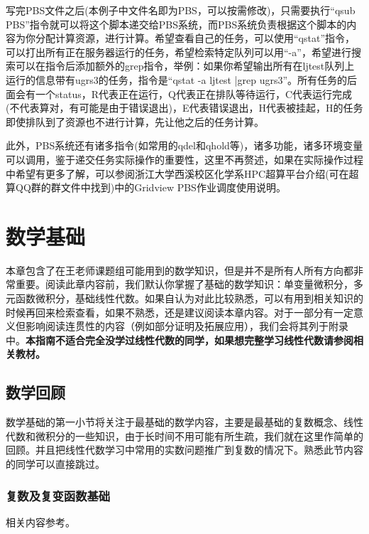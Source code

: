 \documentclass[12pt,a4paper,openany,twoside]{book}
\numberwithin{equation}{section}
\begin{document}
        写完PBS文件之后(本例子中文件名即为PBS，可以按需修改)，只需要执行“qsub PBS”指令就可以将这个脚本递交给PBS系统，而PBS系统负责根据这个脚本的内容为你分配计算资源，进行计算。希望查看自己的任务，可以使用“qstat”指令，可以打出所有正在服务器运行的任务，希望检索特定队列可以用“-a”，希望进行搜索可以在指令后添加额外的grep指令，举例：如果你希望输出所有在ljtest队列上运行的信息带有ugrs3的任务，指令是“qstat -a ljtest |grep ugrs3”。所有任务的后面会有一个status，R代表正在运行，Q代表正在排队等待运行，C代表运行完成(不代表算对，有可能是由于错误退出)，E代表错误退出，H代表被挂起，H的任务即使排队到了资源也不进行计算，先让他之后的任务计算。

        此外，PBS系统还有诸多指令(如常用的qdel和qhold等)，诸多功能，诸多环境变量可以调用，鉴于递交任务实际操作的重要性，这里不再赘述，如果在实际操作过程中希望有更多了解，可以参阅浙江大学西溪校区化学系HPC超算平台介绍(可在超算QQ群的群文件中找到)中的Gridview PBS作业调度使用说明。
      
    \chapter{数学基础}

      本章包含了在王老师课题组可能用到的数学知识，但是并不是所有人所有方向都非常重要。阅读此章内容前，我们默认你掌握了基础的数学知识：单变量微积分，多元函数微积分，基础线性代数。如果自认为对此比较熟悉，可以有用到相关知识的时候再回来检索查看，如果不熟悉，还是建议阅读本章内容。对于一部分有一定意义但影响阅读连贯性的内容（例如部分证明及拓展应用），我们会将其列于附录中。\textbf{本指南不适合完全没学过线性代数的同学，如果想完整学习线性代数请参阅相关教材。}

      \section{数学回顾}
      
        数学基础的第一小节将关注于最基础的数学内容，主要是最基础的复数概念、线性代数和微积分的一些知识，由于长时间不用可能有所生疏，我们就在这里作简单的回顾。并且把线性代数学习中常用的实数问题推广到复数的情况下。熟悉此节内容的同学可以直接跳过。

        \subsection{复数及复变函数基础}

          相关内容参考\cite{methods_in_math_phys_liang}。

          {}
          
\end{document}
